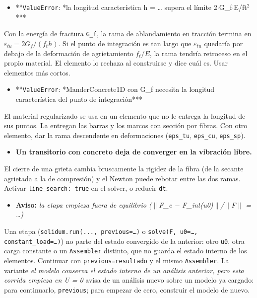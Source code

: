 \documentclass[11pt,oneside]{report}
\begin{document}
\begin{itemize}
  \item **\texttt{ValueError}: *la longitud característica h = \ldots{} supera el límite 2\ensuremath{\cdot}G\_f\ensuremath{\cdot}E/ft\ensuremath{^{2}}***
\end{itemize}
  Con la energía de fractura \texttt{G\_f}, la rama de ablandamiento en tracción termina en $\varepsilon_{tu} = 2G_f/(f_t h)$. Si el punto de integración es tan largo que $\varepsilon_{tu}$ quedaría por debajo de la deformación de agrietamiento $f_t/E$, la rama tendría retroceso en el propio material. El elemento lo rechaza al construirse y dice cuál es. Usar elementos más cortos.

\begin{itemize}
  \item **\texttt{ValueError}: *ManderConcrete1D con G\_f necesita la longitud característica del punto de integración***
\end{itemize}
  El material regularizado se usa en un elemento que no le entrega la longitud de sus puntos. La entregan las barras y los marcos con sección por fibras. Con otro elemento, dar la rama descendente en deformaciones (\texttt{eps\_tu}, \texttt{eps\_cu}, \texttt{eps\_sp}).

\begin{itemize}
  \item \textbf{Un transitorio con concreto deja de converger en la vibración libre.}
\end{itemize}
  El cierre de una grieta cambia bruscamente la rigidez de la fibra (de la secante agrietada a la de compresión) y el Newton puede rebotar entre las dos ramas. Activar \texttt{line\_\allowbreak{}search: true} en el solver, o reducir \texttt{dt}.

\begin{itemize}
  \item \textbf{Aviso:} \textit{la etapa empieza fuera de equilibrio (\ensuremath{\|}F\_c − F\_int(u0)\ensuremath{\|}/\ensuremath{\|}F\ensuremath{\|} = \ldots{})}
\end{itemize}
  Una etapa (\texttt{solidum.\allowbreak{}run(.\allowbreak{}.\allowbreak{}.\allowbreak{}, previous=\ldots{})} o \texttt{solve(F, u0=\ldots{}, constant\_\allowbreak{}load=\ldots{})}) no parte del estado convergido de la anterior: otro \texttt{u0}, otra carga constante o un \texttt{Assembler} distinto, que no guarda el estado interno de los elementos. Continuar con \texttt{previous=resultado} y el mismo \texttt{Assembler}. La variante \textit{el modelo conserva el estado interno de un análisis anterior, pero esta corrida empieza en U = 0} avisa de un análisis nuevo sobre un modelo ya cargado: para continuarlo, \texttt{previous}; para empezar de cero, construir el modelo de nuevo.
\end{document}
